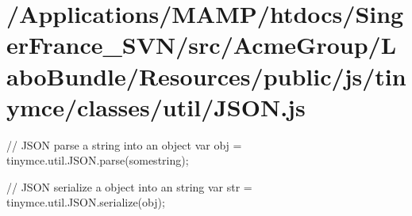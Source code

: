 \hypertarget{_2_applications_2_m_a_m_p_2htdocs_2_singer_france__s_v_n_2src_2_acme_group_2_labo_bundle_2_resou34d42116fbd953ae2d89e81721926182}{\section{/\+Applications/\+M\+A\+M\+P/htdocs/\+Singer\+France\+\_\+\+S\+V\+N/src/\+Acme\+Group/\+Labo\+Bundle/\+Resources/public/js/tinymce/classes/util/\+J\+S\+O\+N.\+js}
}
// J\+S\+O\+N parse a string into an object var obj = tinymce.\+util.\+J\+S\+O\+N.\+parse(somestring);

// J\+S\+O\+N serialize a object into an string var str = tinymce.\+util.\+J\+S\+O\+N.\+serialize(obj);


\begin{DoxyCodeInclude}
\end{DoxyCodeInclude}
 
